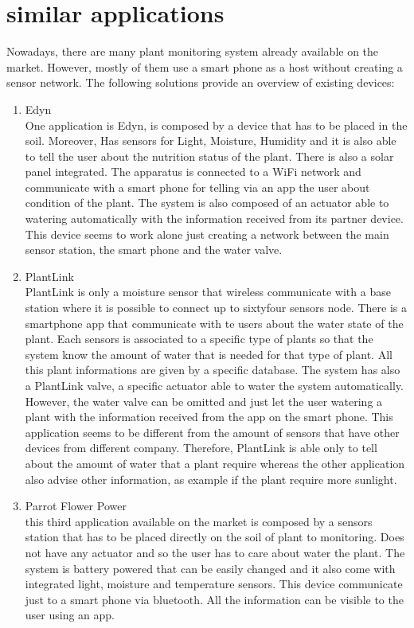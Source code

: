 \documentclass[conference]{IEEEtran}
\begin{document}
\section{similar applications}
Nowadays, there are many plant monitoring system already available on the market. However, mostly of them use a smart phone as a host without creating a sensor network. The following solutions provide an overview of existing devices:\\
\begin{enumerate}
	\item Edyn \\
One application is Edyn, is composed by a device that has to be placed in the soil. Moreover, Has sensors for Light, Moisture,  Humidity and it is also able to tell the user about the nutrition status of the plant. There is also a solar panel integrated. The apparatus is connected to a WiFi network and communicate with a smart phone for telling via an app the user about condition of the plant. The system is also composed of an actuator able to watering automatically with the information received from its partner device. This device seems to work alone just creating a network between the main sensor station, the smart phone and the water valve.  \\
\item PlantLink\\
PlantLink is only a moisture sensor that wireless communicate with a base station where it is possible to connect up to sixtyfour sensors node. There is a smartphone app that communicate with te users about the water state of the plant. Each sensors is associated to a specific type of plants so that the system know the amount of water that is needed for that type of plant. All this plant informations are given by a specific database. The system has also a PlantLink valve, a specific actuator able to water the system automatically. However, the water valve can be omitted and just let the user watering a plant with the information received from the app on the smart phone. This application seems to be different from the amount of sensors that have other devices from different company. Therefore, PlantLink is able only to tell about the amount of water that a plant require whereas the other application also advise other information, as example if the plant require more sunlight.\\
\item Parrot Flower Power\\

this third application available on the market is composed by a sensors station that has to be placed directly on the soil of plant to monitoring. Does not have any actuator and so the user has to care about water the plant. The system is battery powered that can be easily changed and it also come with integrated light, moisture and temperature sensors. This device communicate just to a smart phone via bluetooth. All the information can be visible to the user using an app.


\end{enumerate}
\end{document}
